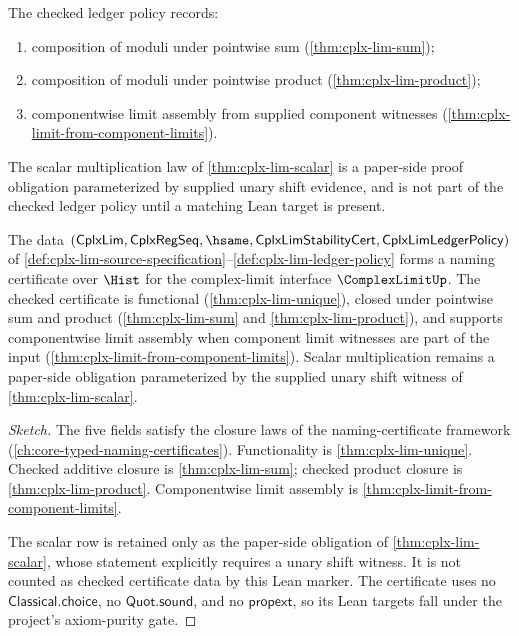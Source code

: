 \begin{definition}
\label{def:cplx-lim-ledger-policy}
The checked ledger policy records:
\begin{enumerate}
  \item composition of moduli under pointwise sum (\autoref{thm:cplx-lim-sum});
  \item composition of moduli under pointwise product (\autoref{thm:cplx-lim-product});
  \item componentwise limit assembly from supplied component witnesses (\autoref{thm:cplx-limit-from-component-limits}).
\end{enumerate}
\end{definition}
The scalar multiplication law of \autoref{thm:cplx-lim-scalar} is a paper-side proof obligation parameterized by supplied unary shift evidence, and is not part of the checked ledger policy until a matching Lean target is present.

\begin{theorem}
\label{thm:complex-limit-namecert}
The data $(\mathsf{CplxLim}, \mathsf{CplxRegSeq}, \hsame, \mathsf{CplxLimStabilityCert}, \mathsf{CplxLimLedgerPolicy})$ of \autoref{def:cplx-lim-source-specification}--\autoref{def:cplx-lim-ledger-policy} forms a naming certificate over $\Hist$ for the complex-limit interface $\ComplexLimitUp$. The checked certificate is functional (\autoref{thm:cplx-lim-unique}), closed under pointwise sum and product (\autoref{thm:cplx-lim-sum} and \autoref{thm:cplx-lim-product}), and supports componentwise limit assembly when component limit witnesses are part of the input (\autoref{thm:cplx-limit-from-component-limits}). Scalar multiplication remains a paper-side obligation parameterized by the supplied unary shift witness of \autoref{thm:cplx-lim-scalar}.
\end{theorem}
\begin{proof}[Sketch]
The five fields satisfy the closure laws of the naming-certificate framework (\autoref{ch:core-typed-naming-certificates}). Functionality is \autoref{thm:cplx-lim-unique}. Checked additive closure is \autoref{thm:cplx-lim-sum}; checked product closure is \autoref{thm:cplx-lim-product}. Componentwise limit assembly is \autoref{thm:cplx-limit-from-component-limits}.

The scalar row is retained only as the paper-side obligation of \autoref{thm:cplx-lim-scalar}, whose statement explicitly requires a unary shift witness. It is not counted as checked certificate data by this Lean marker. The certificate uses no $\mathsf{Classical.choice}$, no $\mathsf{Quot.sound}$, and no $\mathsf{propext}$, so its Lean targets fall under the project's axiom-purity gate.
\end{proof}


